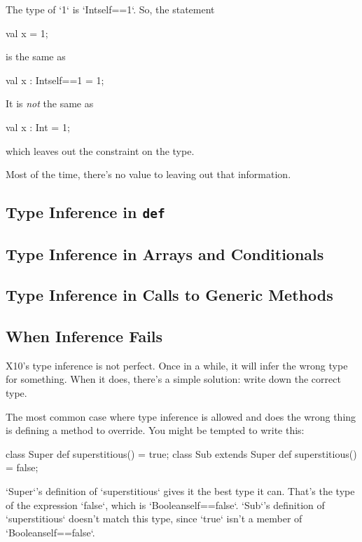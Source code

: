 The type of \xcd`1` is \xcd`Int{self==1}`.  So, the statement
\begin{xten}
val x = 1;
\end{xten}
is the same as 
\begin{xten}
val x : Int{self==1} = 1;
\end{xten}

It is {\em not} the same as 
\begin{xten}
val x : Int = 1;
\end{xten}
which leaves out the constraint on the type.

Most of the time, there's no value to leaving out that information.  



\subsection{Type Inference in {\tt def}}
\subsection{Type Inference in Arrays and Conditionals}
\subsection{Type Inference in Calls to Generic Methods}







\subsection{When Inference Fails}
X10's type inference is not perfect.  Once in a while, it will infer the wrong
type for something.  When it does, there's a simple solution: write down the
correct type.

The most common case where type inference is allowed and does the wrong thing
is defining a method to override.  You might be tempted to write this: 
\begin{xten}
class Super {
  def superstitious() = true;
}
class Sub extends Super {
  def superstitious() = false;
}
\end{xten}
\xcd`Super`'s definition of \xcd`superstitious` gives it the best type it can.
That's the type of the expression \xcd`false`, which is
\xcd`Boolean{self==false}`.  \xcd`Sub`'s definition of \xcd`superstitious`
doesn't match this type, since \xcd`true` isn't a member of 
\xcd`Boolean{self==false}`.

